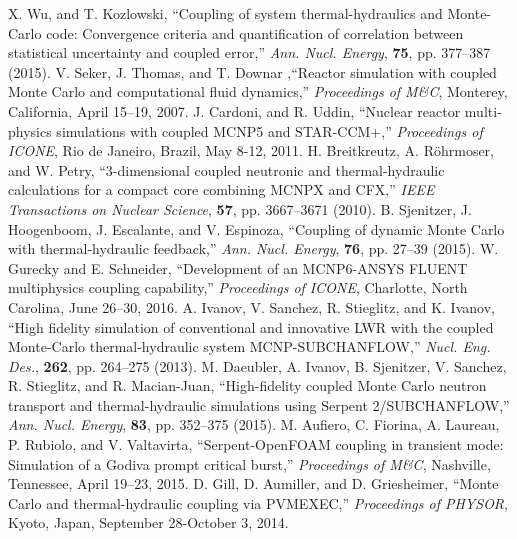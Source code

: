 \documentclass[letterpaper]{physor2018}
\begin{document}
\setlength{\baselineskip}{12pt}
\begin{thebibliography}{300}
 X. Wu, and T. Kozlowski, ``Coupling of system thermal-hydraulics and
Monte-Carlo code: Convergence criteria and quantification of correlation between
statistical uncertainty and coupled error,'' \emph{Ann. Nucl. Energy},
  \textbf{75}, pp. 377--387 (2015).
 V. Seker, J. Thomas, and T. Downar ,``Reactor simulation with
coupled Monte Carlo and computational fluid dynamics,''
\emph{Proceedings of M\&C},
  Monterey, California, April 15--19, 2007.
 J. Cardoni, and R. Uddin, ``Nuclear reactor multi-physics simulations
with coupled MCNP5 and STAR-CCM+,'' \emph{Proceedings of ICONE},
  Rio de Janeiro, Brazil, May 8-12, 2011.
 H. Breitkreutz, A. R{\"o}hrmoser, and W. Petry, ``3-dimensional
coupled neutronic and thermal-hydraulic calculations for a compact core
combining MCNPX and CFX,'' \emph{IEEE Transactions on Nuclear Science},
  \textbf{57}, pp. 3667--3671 (2010).
 B. Sjenitzer, J. Hoogenboom, J. Escalante, and V. Espinoza,
``Coupling of dynamic Monte Carlo with thermal-hydraulic feedback,''
\emph{Ann. Nucl. Energy}, \textbf{76}, pp. 27--39 (2015).
 W. Gurecky and E. Schneider, ``Development of an MCNP6-ANSYS FLUENT
multiphysics coupling capability,'' \emph{Proceedings of ICONE},
Charlotte, North Carolina, June 26--30, 2016.
 A. Ivanov, V. Sanchez, R. Stieglitz, and K. Ivanov,
``High fidelity simulation of conventional and innovative LWR with the coupled Monte-Carlo
thermal-hydraulic system MCNP-SUBCHANFLOW,''
\emph{Nucl. Eng. Des.}, \textbf{262}, pp. 264--275 (2013).
 M. Daeubler, A. Ivanov, B. Sjenitzer, V. Sanchez, R. Stieglitz, and R. Macian-Juan,
``High-fidelity coupled Monte Carlo neutron transport and thermal-hydraulic
simulations using Serpent 2/SUBCHANFLOW,''
\emph{Ann. Nucl. Energy}, \textbf{83}, pp. 352--375 (2015).
 M. Aufiero, C. Fiorina, A. Laureau, P. Rubiolo, and V. Valtavirta,
``Serpent-OpenFOAM coupling in transient mode: Simulation of a Godiva
prompt critical burst,'' \emph{Proceedings of M\&C},
Nashville, Tennessee, April 19--23, 2015.
 D. Gill, D. Aumiller, and D. Griesheimer,
``Monte Carlo and thermal-hydraulic coupling via PVMEXEC,''
\emph{Proceedings of PHYSOR}, Kyoto, Japan, September 28-October 3, 2014.

\end{thebibliography}
\end{document}

